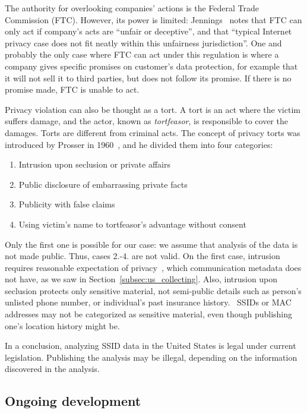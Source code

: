 \documentclass[12pt,a4paper,oneside,pdftex]{report}
\begin{document}
The authority for overlooking companies' actions is the Federal Trade Commission (FTC). However, its power is limited: Jennings~\cite{jennings2012track} notes that FTC can only act if company's acts are ``unfair or deceptive'', and that ``typical Internet privacy case does not fit neatly within this unfairness jurisdiction''. One and probably the only case where FTC can act under this regulation is where a company gives specific promises on customer's data protection, for example that it will not sell it to third parties, but does not follow its promise. If there is no promise made, FTC is unable to act.~\cite{jennings2012track}

Privacy violation can also be thought as a tort. A tort is an act where the victim suffers damage, and the actor, known as \emph{tortfeasor}, is responsible to cover the damages. Torts are different from criminal acts. The concept of privacy torts was introduced by Prosser in 1960~\cite{prosser196048calif}, and he divided them into four categories:

\begin{enumerate}
    \item Intrusion upon seclusion or private affairs
    \item Public disclosure of embarrassing private facts
    \item Publicity with false claims
    \item Using victim's name to tortfeasor's advantage without consent
\end{enumerate}

Only the first one is possible for our case: we assume that analysis of the data is not made public. Thus, cases 2.-4. are not valid. On the first case, intrusion requires reasonable expectation of privacy~\cite{yeatesprivacy}, which communication metadata does not have, as we saw in Section~\ref{subsec:us_collecting}. Also, intrusion upon seclusion protects only sensitive material, not semi-public details such as person's unlisted phone number, or individual's past insurance history.~\cite{evans2012s} SSIDs or MAC addresses may not be categorized as sensitive material, even though publishing one's location history might be.

In a conclusion, analyzing SSID data in the United States is legal under current legislation. Publishing the analysis may be illegal, depending on the information discovered in the analysis.

\subsection{Ongoing development}
\end{document}
